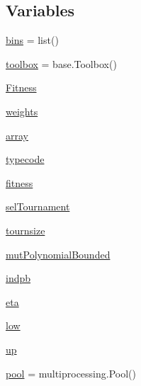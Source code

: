 \subsection*{Variables}
\begin{DoxyCompactItemize}
\item 
\hyperlink{namespacecode_1_1ga_model_1_1ga_model_weights_a0939fb49f49f263b0f1b897dcb1ef2b6}{bins} = list()
\item 
\hyperlink{namespacecode_1_1ga_model_1_1ga_model_weights_a5ab01f05781fcd46d0cf0601942b4062}{toolbox} = base.\+Toolbox()
\item 
\hyperlink{namespacecode_1_1ga_model_1_1ga_model_weights_a76e32761c4a2322338781fb9f8ef2fb7}{Fitness}
\item 
\hyperlink{namespacecode_1_1ga_model_1_1ga_model_weights_ab35ccd893150a2e64b8e4282c06e208c}{weights}
\item 
\hyperlink{namespacecode_1_1ga_model_1_1ga_model_weights_abeccb66239bf188f8bbad7ed63e3a4e1}{array}
\item 
\hyperlink{namespacecode_1_1ga_model_1_1ga_model_weights_a92b4a575d52e2de18414a49d9ded2a9f}{typecode}
\item 
\hyperlink{namespacecode_1_1ga_model_1_1ga_model_weights_abfb5dfea2e767cb34d80eb353a327870}{fitness}
\item 
\hyperlink{namespacecode_1_1ga_model_1_1ga_model_weights_a7fce0e441e755346732041135501d4c2}{sel\+Tournament}
\item 
\hyperlink{namespacecode_1_1ga_model_1_1ga_model_weights_af2087b353eff071373c11ae14af40d9a}{tournsize}
\item 
\hyperlink{namespacecode_1_1ga_model_1_1ga_model_weights_a7ec95bf83ee291f6601b6f1dc1c52cf6}{mut\+Polynomial\+Bounded}
\item 
\hyperlink{namespacecode_1_1ga_model_1_1ga_model_weights_af86f476a10ac573ef8ff4b89a07c009e}{indpb}
\item 
\hyperlink{namespacecode_1_1ga_model_1_1ga_model_weights_a97d0b5f7792b42e02e54b15ece09e86f}{eta}
\item 
\hyperlink{namespacecode_1_1ga_model_1_1ga_model_weights_aebcf39fb03789be03694d4c2ace80e75}{low}
\item 
\hyperlink{namespacecode_1_1ga_model_1_1ga_model_weights_a8cd9c8a4db73ef8984b3c7b6c3cfdf9c}{up}
\item 
\hyperlink{namespacecode_1_1ga_model_1_1ga_model_weights_a6999b3960cc864e03f174b06511ffe4d}{pool} = multiprocessing.\+Pool()
\end{DoxyCompactItemize}


